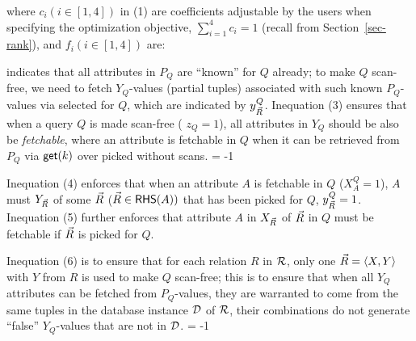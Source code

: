 \vspace{-0.7ex}

\sstab
where $c_{i} (i\in[1, 4])$  in (1) are coefficients adjustable
by the users when specifying the
optimization objective,  $\sum_{i=1}^{4}c_{i} = 1$ (recall
from Section~\ref{sec-rank}), and $f_{i}(i\in [1, 4])$ are:

\begin{tcolorbox}
\end{tcolorbox}

 indicates that all
attributes in $P_{Q}$ are ``known'' for $Q$ already; to make
$Q$ scan-free, we need to fetch $Y_{Q}$-values (partial tuples) associated
with such known $P_{Q}$-values via selected \bss for
$Q$, which are indicated by $y_{\vec{R}}^{Q}$.
Inequation (3) ensures that when a query $Q$ is made scan-free (\ie
$z_{Q} = 1$), all attributes in $Y_{Q}$ should be also be
{\em fetchable}, where an attribute is fetchable in $Q$
when it can be retrieved from $P_{Q}$ via $\protect\mathsf{get}(k)$ over picked
\bss without scans.
\looseness = -1

\vspace{0.6ex}
Inequation (4) enforces that when an attribute $A$ is fetchable in
$Q$ (\ie $X_{A}^{Q} = 1$), $A$ must  $Y_{\vec{R}}$ of some \bs $\vec{R}$ ($\vec{R} \in {\ensuremath {\mathsf{RHS}}}(A))$
that has been picked for $Q$, \ie $y_{\vec{R}}^{Q} = 1$.
Inequation (5) further enforces that attribute $A$ in $X_{\vec{R}}$
of $\vec{R}$ in $Q$ must be fetchable if $\vec{R}$ is picked for $Q$.

\vspace{0.6ex}
Inequation (6) is to ensure that for each relation $R$ in ${\mathcal R}$,
only one \bs $\vec{R} \allowbreak =\allowbreak \langle X,\allowbreak Y\rangle$ with $Y$ from $R$ is used
to make $Q$ scan-free; this is to ensure that when all $Y_{Q}$ attributes
can be fetched from $P_{Q}$-values, they are warranted to come from
the same tuples in the database instance $\mathcal D$ of ${\mathcal R}$, \ie their
combinations do not generate ``false'' $Y_{Q}$-values that are
not in $\mathcal D$.
\looseness = -1


